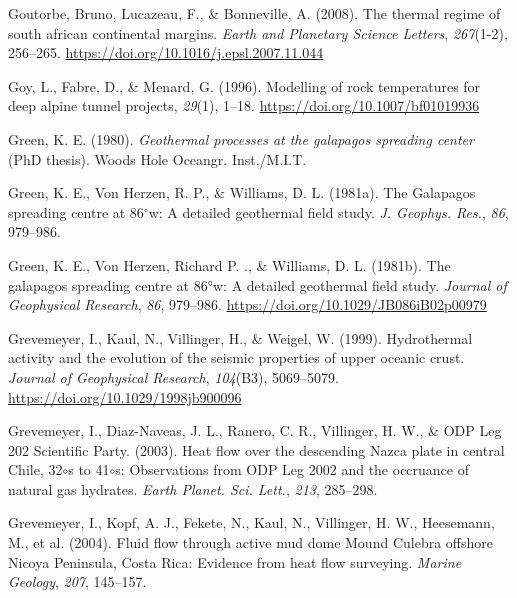 \documentclass[draft,linenumbers]{agujournal2018}
\begin{document}
\leavevmode{}%
Goutorbe, Bruno, Lucazeau, F., \& Bonneville, A. (2008). The thermal
regime of south african continental margins. \emph{Earth and Planetary
Science Letters}, \emph{267}(1-2), 256--265.
\url{https://doi.org/10.1016/j.epsl.2007.11.044}

\leavevmode{}%
Goy, L., Fabre, D., \& Menard, G. (1996). Modelling of rock temperatures
for deep alpine tunnel projects, \emph{29}(1), 1--18.
\url{https://doi.org/10.1007/bf01019936}

\leavevmode{}%
Green, K. E. (1980). \emph{Geothermal processes at the galapagos
spreading center} (PhD thesis). Woods Hole Oceangr. Inst./M.I.T.

\leavevmode{}%
Green, K. E., Von Herzen, R. P., \& Williams, D. L. (1981a). The
{Galapagos} spreading centre at 86\(^\circ\)w: A detailed geothermal
field study. \emph{J. Geophys. Res.}, \emph{86}, 979--986.

\leavevmode{}%
Green, K. E., Von Herzen, Richard P. ., \& Williams, D. L. (1981b). The
galapagos spreading centre at 86°w: A detailed geothermal field study.
\emph{Journal of Geophysical Research}, \emph{86}, 979--986.
\url{https://doi.org/10.1029/JB086iB02p00979}

\leavevmode{}%
Grevemeyer, I., Kaul, N., Villinger, H., \& Weigel, W. (1999).
Hydrothermal activity and the evolution of the seismic properties of
upper oceanic crust. \emph{Journal of Geophysical Research},
\emph{104}(B3), 5069--5079. \url{https://doi.org/10.1029/1998jb900096}

\leavevmode{}%
Grevemeyer, I., Diaz-Naveas, J. L., Ranero, C. R., Villinger, H. W., \&
ODP Leg 202 Scientific Party. (2003). Heat flow over the descending
{Nazca} plate in central {Chile}, 32\(\circ\)s to 41\(\circ\)s:
Observations from {ODP Leg 2002} and the occruance of natural gas
hydrates. \emph{Earth Planet. Sci. Lett.}, \emph{213}, 285--298.

\leavevmode{}%
Grevemeyer, I., Kopf, A. J., Fekete, N., Kaul, N., Villinger, H. W.,
Heesemann, M., et al. (2004). Fluid flow through active mud dome {Mound
Culebra} offshore {Nicoya Peninsula, Costa Rica}: Evidence from heat
flow surveying. \emph{Marine Geology}, \emph{207}, 145--157.
\end{document}
